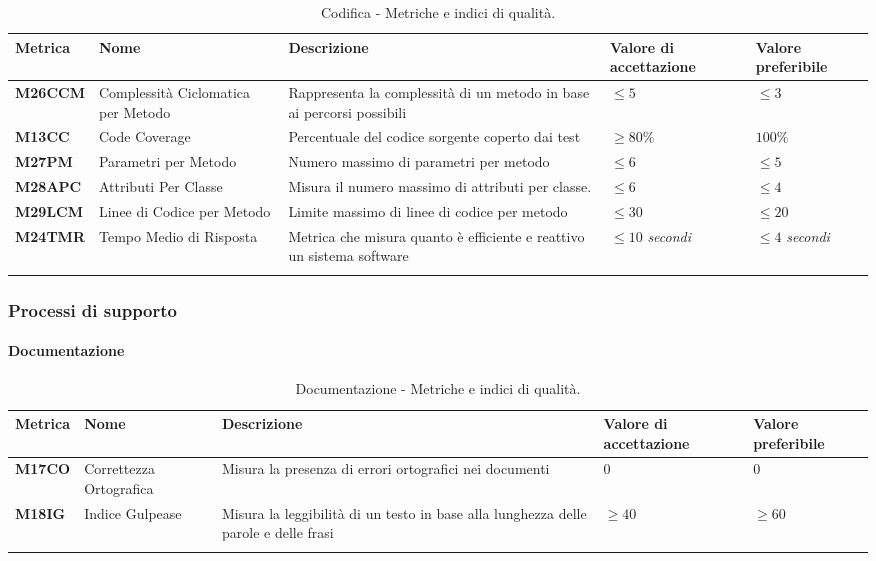 \hspace{1pt}
    \begin{longtable}{|C{1.5cm}|L{3cm}|L{4cm}|L{2.5cm}|L{2.5cm}|}
        \hline
        \textbf{Metrica} & \textbf{Nome} & \textbf{Descrizione} & \textbf{Valore di accettazione} & \textbf{Valore preferibile} \\
        \hline
        \textbf{M26CCM} & Complessità Ciclomatica per Metodo & Rappresenta la complessità di un metodo in base ai percorsi possibili & $\leq 5$ & $\leq 3$ \\
        \hline
        \textbf{M13CC} & Code Coverage & Percentuale del codice sorgente coperto dai test & $\geq 80\%$ & $100\%$ \\
        \hline
        \textbf{M27PM} & Parametri per Metodo & Numero massimo di parametri per metodo & $\leq 6$ & $\leq 5$ \\
        \hline
        \textbf{M28APC} & Attributi Per Classe & Misura il numero massimo di attributi per classe. & $\leq 6$ & $\leq 4$ \\
        \hline
        \textbf{M29LCM} & Linee di Codice per Metodo & Limite massimo di linee di codice per metodo & $\leq 30$ & $\leq 20$ \\
        \hline
        \textbf{M24TMR} & Tempo Medio di Risposta & Metrica che misura quanto è efficiente e reattivo un sistema software & $\leq 10$ \textit{secondi}  & $\leq 4$ \textit{secondi} \\
        \hline
    \caption{Codifica - Metriche e indici di qualità.}
    \label{tab:metriche}
\end{longtable}




\subsubsection{Processi di supporto}

\paragraph{Documentazione}
\hspace{1pt}
    \begin{longtable}{|C{1.5cm}|L{3cm}|L{4cm}|L{2.5cm}|L{2.5cm}|}
        \hline
        \textbf{Metrica} & \textbf{Nome} & \textbf{Descrizione} & \textbf{Valore di accettazione} & \textbf{Valore preferibile} \\
        \hline
        \textbf{M17CO} & Correttezza Ortografica & Misura la presenza di errori ortografici nei documenti & $0$ & $0$ \\
        \hline
        \textbf{M18IG} & Indice Gulpease & Misura la leggibilità di un testo in base alla lunghezza delle parole e delle frasi & $\geq 40$ & $\geq 60$ \\
        \hline
    \caption{Documentazione - Metriche e indici di qualità.}
    \label{tab:metriche_testo}
\end{longtable}

